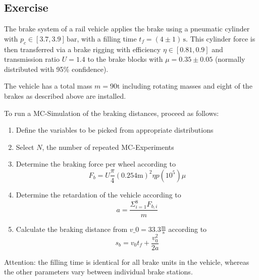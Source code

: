 \documentclass[11pt,a4paper, d]{scrartcl}
\makeatletter
\providecommand{\tightlist}{%
      \setlength{\itemsep}{0pt}\setlength{\parskip}{0pt}}
\newcommand{\boxspacing}{\kern\kvtcb@left@rule\kern\kvtcb@boxsep}
\newcommand{\prompt}[4]{
        {\ttfamily\llap{{\color{#2}[#3]:\hspace{3pt}#4}}\vspace{-\baselineskip}}
    }
\makeatother
\begin{document}
    \begin{tcolorbox}[breakable, size=fbox, boxrule=1pt, pad at break*=1mm,colback=cellbackground, colframe=cellborder]
\prompt{In}{incolor}{ }{\boxspacing}
\begin{Verbatim}[commandchars=\\\{\}]

\end{Verbatim}
\end{tcolorbox}

    \hypertarget{exercise}{%
\subsection{Exercise}\label{exercise}}

The brake system of a rail vehicle applies the brake using a pneumatic
cylinder with \(p_c \in \left[3.7, 3.9 \right]\, \mathrm{bar}\), with a
filling time \(t_f = (4\pm1)\,\mathrm{s}\). This cylinder force is then
transferred via a brake rigging with efficiency
\(\eta \in \left[0.81, 0.9 \right]\) and transmission ratio \(U=1.4\) to
the brake blocks with \(\mu = 0.35\pm0.05\) (normally distributed with
95\% confidence).

The vehicle has a total mass \(m = 90\mathrm{t}\) including rotating
masses and eight of the brakes as described above are installed.

To run a MC-Simulation of the braking distances, proceed as follows:

\begin{enumerate}
\def\labelenumi{\arabic{enumi}.}
\tightlist
\item
  Define the variables to be picked from appropriate distributions
\item
  Select \(N\), the number of repeated MC-Experiments
\item
  Determine the braking force per wheel according to
  \[F_b = U \frac{\pi}{4} (0.254 \mathrm{m})^2\eta p (10^5) \mu\]
\item
  Determine the retardation of the vehicle according to
  \[a = \frac{\Sigma_{i=1}^8 F_{b,i}}{m}\]
\item
  Calculate the braking distance from $v\_0 =
  33.3\frac{\mathrm{m}}{\mathrm{s}} $ according to
  \[s_b = v_0 t_f + \frac{v_0^2}{2a}\]
\end{enumerate}

Attention: the filling time is identical for all brake units in the
vehicle, whereas the other parameters vary between individual brake
stations.
\end{document}

